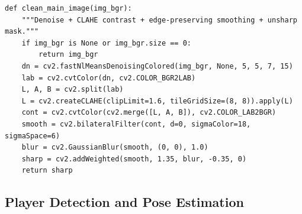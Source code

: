 \begin{lstlisting}[caption={\texttt{clean\_main\_image()} --- denoising, CLAHE contrast, and unsharp masking applied to every input image before detection (Section~\ref{sec:preprocessing}).}]
def clean_main_image(img_bgr):
    """Denoise + CLAHE contrast + edge-preserving smoothing + unsharp mask."""
    if img_bgr is None or img_bgr.size == 0:
        return img_bgr
    dn = cv2.fastNlMeansDenoisingColored(img_bgr, None, 5, 5, 7, 15)
    lab = cv2.cvtColor(dn, cv2.COLOR_BGR2LAB)
    L, A, B = cv2.split(lab)
    L = cv2.createCLAHE(clipLimit=1.6, tileGridSize=(8, 8)).apply(L)
    cont = cv2.cvtColor(cv2.merge([L, A, B]), cv2.COLOR_LAB2BGR)
    smooth = cv2.bilateralFilter(cont, d=0, sigmaColor=18, sigmaSpace=6)
    blur = cv2.GaussianBlur(smooth, (0, 0), 1.0)
    sharp = cv2.addWeighted(smooth, 1.35, blur, -0.35, 0)
    return sharp
\end{lstlisting}

\subsection{Player Detection and Pose Estimation}

